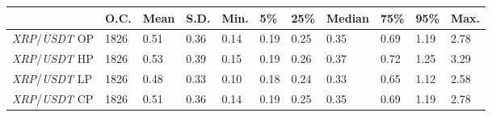 \begin{tabular}{lllllllllll}
\toprule
 & \textbf{O.C.} & \textbf{Mean} & \textbf{S.D.} & \textbf{Min.} & \textbf{5\%} & \textbf{25\%} & \textbf{Median} & \textbf{75\%} & \textbf{95\%} & \textbf{Max.} \\
\midrule
\emph{XRP}/\emph{USDT} OP & 1826 & 0.51 & 0.36 & 0.14 & 0.19 & 0.25 & 0.35 & 0.69 & 1.19 & 2.78 \\
\emph{XRP}/\emph{USDT} HP & 1826 & 0.53 & 0.39 & 0.15 & 0.19 & 0.26 & 0.37 & 0.72 & 1.25 & 3.29 \\
\emph{XRP}/\emph{USDT} LP & 1826 & 0.48 & 0.33 & 0.10 & 0.18 & 0.24 & 0.33 & 0.65 & 1.12 & 2.58 \\
\emph{XRP}/\emph{USDT} CP & 1826 & 0.51 & 0.36 & 0.14 & 0.19 & 0.25 & 0.35 & 0.69 & 1.19 & 2.78 \\
\bottomrule
\end{tabular}
